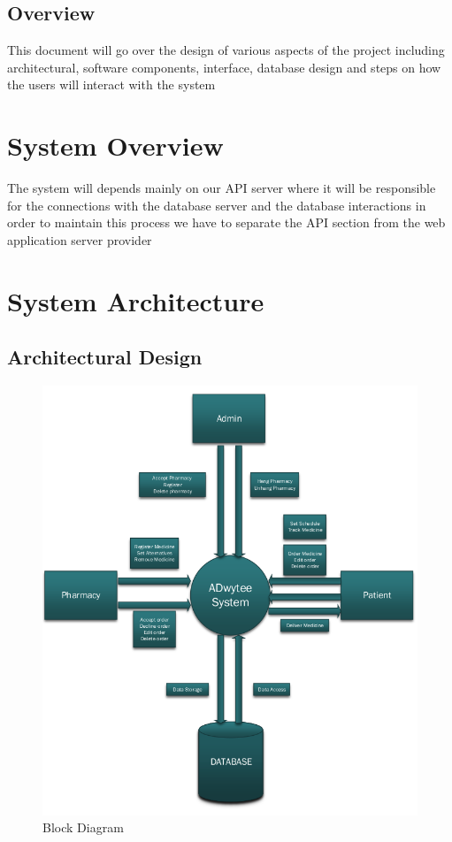 \documentclass[]{article}
\begin{document}
\subsection{Overview}
This document will go over the design of various aspects of the project including architectural, software components, interface, database design and steps on how the users will interact with the system 


\section{System Overview}
The system will depends mainly on our API server where it will be responsible for the connections with the database server and the database interactions in order to maintain this process we have to separate the API section from the web application server provider   

\section{System Architecture}
\subsection{Architectural Design}

\begin{figure}[H]
\centering
\includegraphics[scale=0.32]{./block}
\caption{Block Diagram}
\end{figure}
\end{document}
